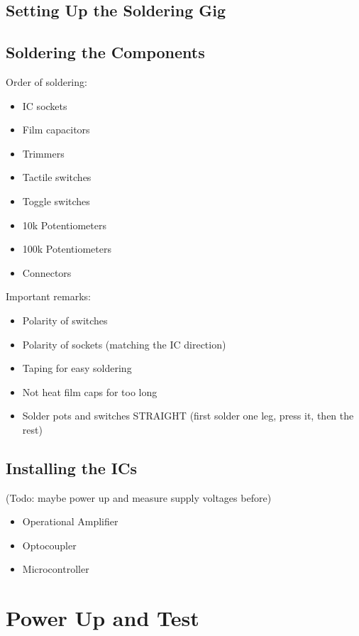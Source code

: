 \documentclass{scrartcl}
\begin{document}
\subsection{Setting Up the Soldering Gig}

\subsection{Soldering the Components}

Order of soldering:

\begin{itemize}
    \item IC sockets
    \item Film capacitors
    \item Trimmers
    \item Tactile switches
    \item Toggle switches
    \item 10k Potentiometers
    \item 100k Potentiometers
    \item Connectors
\end{itemize}

Important remarks:

\begin{itemize}
    \item Polarity of switches
    \item Polarity of sockets (matching the IC direction)
    \item Taping for easy soldering
    \item Not heat film caps for too long
    \item Solder pots and switches STRAIGHT
          (first solder one leg, press it, then the rest)
\end{itemize}

\subsection{Installing the ICs}

(Todo: maybe power up and measure supply voltages before)

\begin{itemize}
    \item Operational Amplifier
    \item Optocoupler
    \item Microcontroller
\end{itemize}

\section{Power Up and Test}
\end{document}
